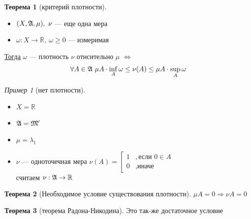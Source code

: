 \documentclass[russ,oneside]{book}
\newcommand{\R}{\mathbb{R}}
\theoremstyle{plain}
\theoremstyle{remark}
\newtheorem*{examp}{Пример}
\theoremstyle{definition}
\newtheorem{theorem}{Теорема}[section]
\begin{document}
\begin{theorem}[критерий плотности]
\-
\begin{itemize}
\item \((X, \mathfrak{A}, \mu),\ \nu\) --- еще одна мера
\item \(\omega: X \to \overline{\R},\ \omega \ge 0\) --- измеримая
\end{itemize}
\uline{Тогда} \(\omega\) --- плотность \(\nu\) отнсительно \(\mu\) \(\Leftrightarrow\)
\[ \forall A \in \mathfrak{A}\ \mu A \cdot \inf_A \omega \le \nu(A) \le \mu A \cdot \sup_A \omega \]
\end{theorem}
\begin{examp}[нет плотности]
\-
\begin{itemize}
\item \(X = \R\)
\item \(\mathfrak{A} = \mathfrak{M}'\)
\item \(\mu = \lambda_1\)
\item \(\nu\) --- одноточечная мера \(\nu(A) = \left[\begin{array}{ll} 1 & ,\text{если } 0 \in A \\ 0 & ,\text{иначе}\end{array}\right.\) \\
считаем \(\nu: \A \to \R\)
\end{itemize}
\end{examp}

\begin{theorem}[Необходимое условие существования плотности]
\(\mu A = 0 \Rightarrow \nu A = 0\)
\end{theorem}
\begin{theorem}[теорема Радона-Никодина]
Это так-же достаточное условие
\end{theorem}
\end{document}
